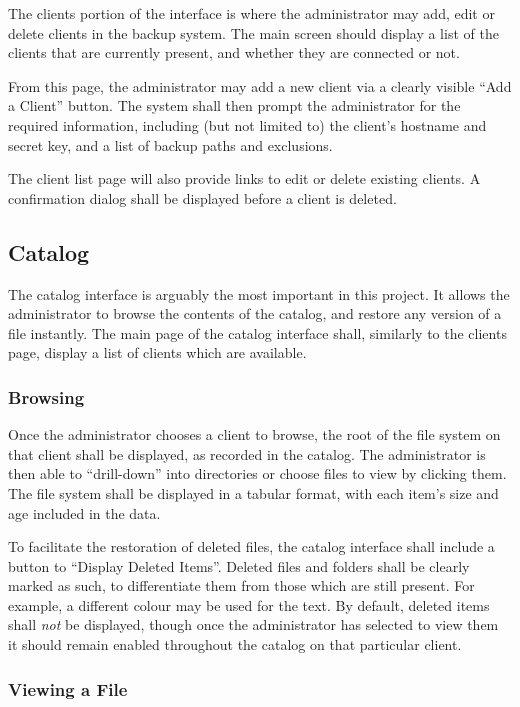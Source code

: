 The clients portion of the interface is where the administrator may add, edit
or delete clients in the backup system. The main screen should display a list
of the clients that are currently present, and whether they are connected or
not.

From this page, the administrator may add a new client via a clearly visible
``Add a Client'' button. The system shall then prompt the administrator for the
required information, including (but not limited to) the client's hostname and
secret key, and a list of backup paths and exclusions.

The client list page will also provide links to edit or delete existing
clients. A confirmation dialog shall be displayed before a client is deleted.

\subsection{Catalog}

The catalog interface is arguably the most important in this project. It allows
the administrator to browse the contents of the catalog, and restore any
version of a file instantly. The main page of the catalog interface shall,
similarly to the clients page, display a list of clients which are available.

\subsubsection{Browsing}

Once the administrator chooses a client to browse, the root of the file system
on that client shall be displayed, as recorded in the catalog. The
administrator is then able to ``drill-down'' into directories or choose files
to view by clicking them. The file system shall be displayed in a tabular
format, with each item's size and age included in the data.

To facilitate the restoration of deleted files, the catalog interface shall
include a button to ``Display Deleted Items''. Deleted files and folders shall
be clearly marked as such, to differentiate them from those which are still
present. For example, a different colour may be used for the text. By default,
deleted items shall \emph{not} be displayed, though once the administrator has
selected to view them it should remain enabled throughout the catalog on that
particular client.

\subsubsection{Viewing a File}

